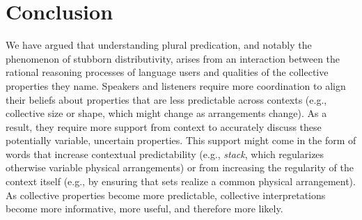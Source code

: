 \documentclass[linguex]{sp}
\begin{document}




\section{Conclusion}

We have argued that understanding plural predication, and notably the phenomenon of stubborn distributivity, arises from an interaction between the rational reasoning processes of language users and qualities of the collective properties they name. Speakers and listeners require more coordination to align their beliefs about properties that are less predictable across contexts (e.g., collective size or shape, which might change as arrangements change). As a result, they require more support from context to accurately discuss these potentially variable, uncertain properties. This support might come in the form of words that increase contextual predictability (e.g., \emph{stack}, which regularizes otherwise variable physical arrangements) or from increasing the regularity of the context itself (e.g., by ensuring that sets realize a common physical arrangement). As collective properties become more predictable, collective interpretations become more informative, more useful, and therefore more likely.
\end{document}
